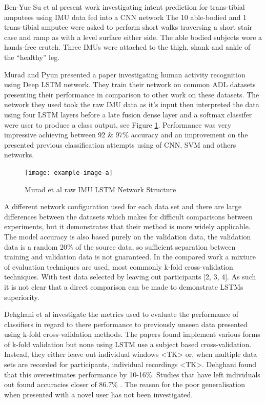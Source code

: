 \documentclass[sensors,article,submit,moreauthors,pdftex]{Definitions/mdpi}
\begin{document}
Ben-Yue Su et al present work investigating intent prediction for trans-tibial amputees using IMU data fed into a CNN network\cite{Su2019} The 10 able-bodied and 1 trans-tibial amputee were asked to perform short walks traversing a short stair case and ramp as with a level surface either side. The able bodied subjects wore a hands-free crutch. Three IMUs were attached to the thigh, shank and ankle of the “healthy” leg.

Murad and Pyun presented a paper investigating human activity recognition using Deep LSTM network\cite{Murad2017}. They train their network on common ADL datasets presenting their performance in comparison to other work on these datasets. The network they used took the raw IMU data as it's input then interpreted the data using four LSTM layers before a late fusion dense layer and a softmax classifer were user to produce a class output, see Figure \ref{fig:murad_lst_network_structure}. Performance was very impressive achieving between 92 \& 97\% accuracy and an improvement on the presented previous classification attempts using of CNN, SVM and others networks.

\begin{figure}[!htb]
    \centering
    \texttt{[image: example-image-a]}
    \caption{Murad et al raw IMU LSTM Network Structure}
    \label{fig:murad_lst_network_structure}
\end{figure}

A different network configuration used for each data set and there are large differences between the datasets which makes for difficult comparisons between experiments, but it demonstrates that their method is more widely applicable. The model accuracy is also based purely on the validation data, the validation data is a random 20\% of the source data, so sufficient separation between training and validation data is not guaranteed. In the compared work a mixture of evaluation techniques are used, most commonly k-fold cross-validation techniques. With test data selected by leaving out participants [2, 3, 4]. As such it is not clear that a direct comparison can be made to demonstrate LSTMs superiority.

Dehghani et al investigate the metrics used to evaluate the performance of classifiers in regard to there performance to previously unseen data presented using k-fold cross-validation methods\cite{Dehghani2019}. The papers found implement various forms of k-fold validation but none using LSTM use a subject based cross-validation. Instead, they either leave out individual windows \cite{Murad2017, Wang2020}<TK> or, when multiple data sets are recorded for participants, individual recordings \cite{Ordonez2016}<TK>. Dehghani found that this overestimates performance by 10-16\%. Studies that have left individuals out found accuracies closer of 86.7\% \cite{Zhao2018}. The reason for the poor generalisation when presented with a novel user has not been investigated.
\end{document}

